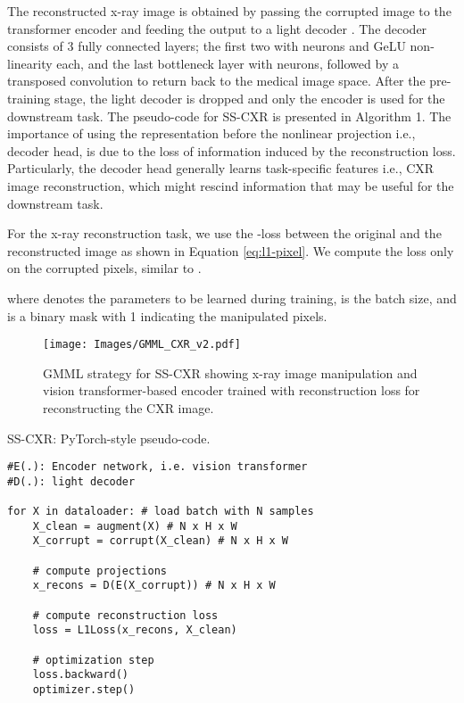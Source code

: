 \documentclass[10pt,journal,compsoc]{IEEEtran}
\begin{document}
The reconstructed x-ray image  is obtained by passing the corrupted image  to the transformer encoder  and feeding the output to a light decoder . The decoder consists of 3 fully connected layers; the first two with  neurons and GeLU non-linearity each, and the last bottleneck layer with  neurons, followed by a transposed convolution to return back to the medical image space. After the pre-training stage, the light decoder  is dropped and only the encoder  is used for the downstream task. The pseudo-code for SS-CXR is presented in Algorithm 1. The importance of using the representation before the nonlinear projection i.e., decoder head, is due to the loss of information induced by the reconstruction loss. Particularly, the decoder head generally learns task-specific features i.e., CXR image reconstruction, which might rescind information that may be useful for the downstream task.

For the x-ray reconstruction task, we use the -loss between the original and the reconstructed image as shown in Equation \ref{eq:l1-pixel}. We compute the loss only on the corrupted pixels, similar to \cite{devlin2018bert,atito2022gmml}.


where  denotes the parameters to be learned during training,  is the batch size, and  is a binary mask with 1 indicating the manipulated pixels.
\begin{figure}[ht]
    \centering
    \texttt{[image: Images/GMML\_CXR\_v2.pdf]}
    \caption{GMML strategy for SS-CXR showing x-ray image manipulation and vision transformer-based encoder trained with reconstruction loss for reconstructing the CXR image.}
    \label{fig:GMMLtransformerarch}
\end{figure}

\begin{algorithm}[!th]
\caption{\mbox{SS-CXR}: PyTorch-style pseudo-code.}
\label{algo:sitml}
\begin{lstlisting}
#E(.): Encoder network, i.e. vision transformer
#D(.): light decoder 

for X in dataloader: # load batch with N samples
    X_clean = augment(X) # N x H x W
    X_corrupt = corrupt(X_clean) # N x H x W
    
    # compute projections
    x_recons = D(E(X_corrupt)) # N x H x W
    
    # compute reconstruction loss
    loss = L1Loss(x_recons, X_clean)    
    
    # optimization step
    loss.backward()
    optimizer.step()


\end{lstlisting}
\end{algorithm}
\end{document}
